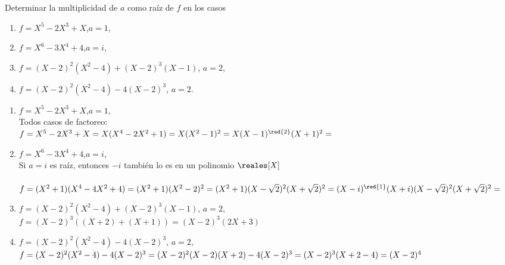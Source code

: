 \ejercicio
Determinar la multiplicidad de $a$ como raíz de $f$  en los casos
\begin{enumerate}[label=\roman*)] 
 \item $f = X^5 - 2X^3 + X$,\quad $a=1$,
 \item $f = X^6 - 3X^4 + 4$,\quad $a=i$, 
 \item $f = (X-2)^2(X^2-4) + (X-2)^3(X-1)$, \quad $a=2$, 
 \item $f = (X-2)^2(X^2-4) - 4(X-2)^3$, \quad $a=2$.
 \end{enumerate}

 \separadorCorto

\begin{enumerate}[label=\roman*)] 
 \item $f = X^5 - 2X^3 + X$,\quad $a=1$,\\ 
   Todos casos de factoreo:\\
    $f = X^5 - 2X^3 + X =
    X(X^4-2X^2 + 1) = 
    X(X^2 - 1)^2 =
    X (X - 1)^{\red{2}} (X + 1)^2 =
    $
    \\

 \item $f = X^6 - 3X^4 + 4$,\quad $a=i$,\\ 
   Si $a=i$ es raíz, entonces $-i$ también lo es en un polinomio $\reales[X]$\\
   \\
    $f =(X^2 + 1)(X^4 - 4X^2 + 4) =
    (X^2 + 1)(X^2-2)^2 =
    (X^2 + 1)(X - \sqrt2)^2 (X + \sqrt2)^2 =\\
    (X - i)^{\red{1}}(X + i)(X - \sqrt2)^2 (X + \sqrt2)^2 =
    $
    \\

 \item $f = (X-2)^2(X^2-4) + (X-2)^3(X-1)$, \quad $a=2$,\\ 
   $
    f =(X-2)^3 ( (X+2) + (X+1)) =
    (X-2)^3 (2X+3)
    $
    \\

 \item $f = (X-2)^2(X^2-4) - 4(X-2)^3$, \quad $a=2$,\\ 
$
 f = 
    (X-2)^2(X^2-4) - 4(X-2)^3 =
    (X-2)^2(X-2)(X+2) - 4(X-2)^3 =\\
    (X-2)^3(X+2 - 4) =
    (X-2)^4
    $
    \\

 \end{enumerate}
